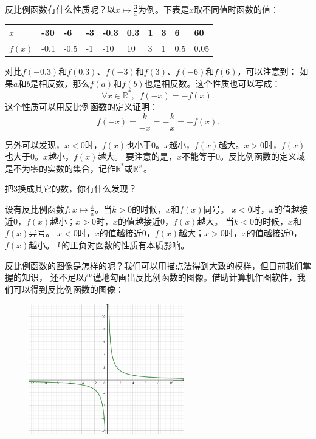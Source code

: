 \documentclass[12pt,UTF8]{ctexbook}
\begin{document}
反比例函数有什么性质呢？以$x \mapsto \frac{3}{x}$为例。下表是$x$取不同值时函数的值：

\begin{center}
    \begin{tabular}{| p{2em}<{\centering} | p{1.8em}<{\centering} | p{1.8em}<{\centering} | p{1.8em}<{\centering} | p{1.8em}<{\centering} | p{1.8em}<{\centering} | p{1.8em}<{\centering} | p{1.8em}<{\centering} | p{1.8em}<{\centering} | p{1.8em}<{\centering} |}
        \hline
        $x$ & -30 & -6 & -3 & -0.3 & 0.3 & 1 & 3 & 6 & 60 \\ [0.5ex] 
        \hline
        $f(x)$ & -0.1 & -0.5 & -1 & -10 & 10 & 3 & 1 & 0.5 & 0.05 \\   
        \hline
    \end{tabular}
\end{center}

对比$f(-0.3)$和$f(0.3)$、$f(-3)$和$f(3)$、$f(-6)$和$f(6)$，可以注意到：
如果$a$和$b$是相反数，那么$f(a)$和$f(b)$也是相反数。这个性质也可以写成：
$$ \forall x\in \mathbb{R}^*, \,\,\, f(-x) = -f(x).$$
这个性质可以用反比例函数的定义证明：
$$f(-x) = \frac{k}{-x} = -\frac{k}{x} = -f(x).$$

另外可以发现，$x<0$时，$f(x)$也小于$0$。$x$越小，$f(x)$越大。$x>0$时，$f(x)$也大于$0$。$x$越小，$f(x)$越大。
要注意的是，$x$不能等于$0$。反比例函数的定义域是不为零的实数的集合，记作$\mathbb{R}^*$或$\mathbb{R}^\times$。

把$3$换成其它的数，你有什么发现？

设有反比例函数$f: x \mapsto \frac{k}{x}$。当$k>0$的时候，$x$和$f(x)$同号。
$x<0$时，$x$的值越接近$0$，$f(x)$越小；$x>0$时，$x$的值越接近$0$，$f(x)$越大。
当$k<0$的时候，$x$和$f(x)$异号。
$x<0$时，$x$的值越接近$0$，$f(x)$越大；$x>0$时，$x$的值越接近$0$，$f(x)$越小。
$k$的正负对函数的性质有本质影响。

反比例函数的图像是怎样的呢？我们可以用描点法得到大致的模样，但目前我们掌握的知识，
还不足以严谨地勾画出反比例函数的图像。借助计算机作图软件，我们可以得到反比例函数的图像：

\begin{figure} %
    \vspace{-20pt}
    \flushright
    \includegraphics[width=0.6\textwidth]{tu/反比例函数1.png}
\end{figure}
\end{document}

